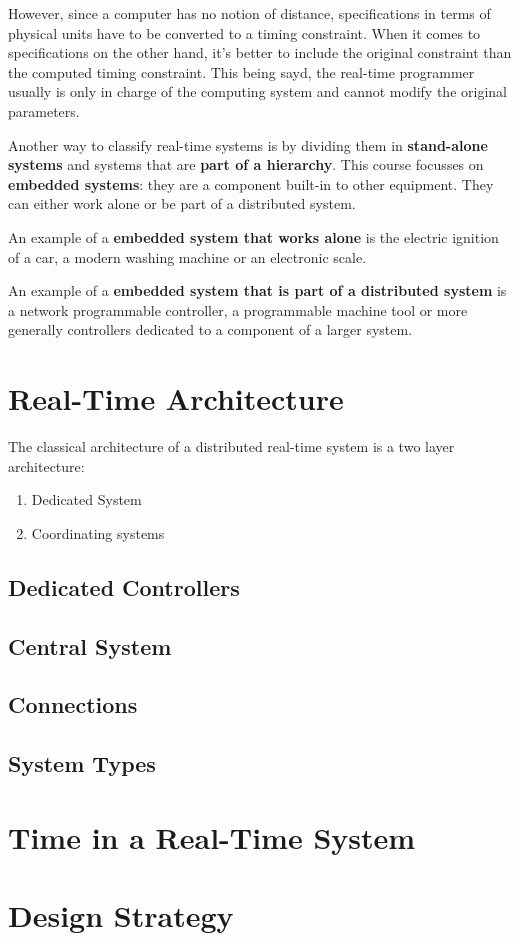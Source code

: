 \documentclass[../main.tex]{subfiles}
\begin{document}
However, since a computer has no notion of distance, specifications in terms of physical units have to be converted to a timing constraint. When it comes to specifications on the other hand, it's better to include the original constraint than the computed timing constraint. This being sayd, the real-time programmer usually is only in charge of the computing system and cannot modify the original parameters.

Another way to classify real-time systems is by dividing them in \textbf{stand-alone systems} and systems that are \textbf{part of a hierarchy}. This course focusses on \textbf{embedded systems}: they are a component built-in to other equipment. They can either work alone or be part of a distributed system.

\begin{exmp}
An example of a \textbf{embedded system that works alone} is the electric ignition of a car, a modern washing machine or an electronic scale.
\end{exmp} 

\begin{exmp}
An example of a \textbf{embedded system that is part of a distributed system} is a network programmable controller, a programmable machine tool or more generally controllers dedicated to a component of a larger system.
\end{exmp} 


\section{Real-Time Architecture}
The classical architecture of a distributed real-time system is a two layer architecture:
\begin{enumerate}
	\item Dedicated System
	\item Coordinating systems
\end{enumerate}

\subsection{Dedicated Controllers}

\subsection{Central System}
\subsection{Connections}
\subsection{System Types}

\section{Time in a Real-Time System}

\section{Design Strategy}
\end{document}
